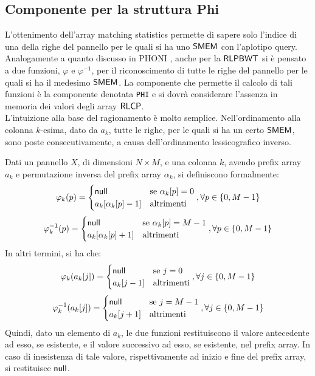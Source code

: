\subsection{Componente per la struttura Phi}
\label{secphi}
L'ottenimento dell'array matching statistics permette di sapere solo
l'indice di una della righe del pannello per le quali si ha uno $\mbox{\rm {\sf SMEM}}$ con
l'aplotipo query. Analogamente a quanto discusso in PHONI \cite{phoni},
anche per la $\mbox{\rm {\sf RLPBWT}}$ si è pensato a due funzioni, $\varphi$ e
$\varphi^{-1}$, per il riconoscimento di tutte le
righe del pannello per le quali si ha il medesimo $\mbox{\rm {\sf SMEM}}$. La componente che
permette il calcolo 
di tali funzioni è la componente denotata \texttt{PHI} e si dovrà considerare
l'assenza in memoria dei valori degli array $\mbox{\rm {\sf RLCP}}$.\\
L'intuizione alla base del ragionamento è molto semplice. Nell'ordinamento alla
colonna $k$-esima, dato da $a_k$, tutte le righe, per le quali si ha un certo
$\mbox{\rm {\sf SMEM}}$, sono poste consecutivamente, a causa dell'ordinamento
lessicografico inverso.
\begin{definizione}
  Dati un pannello $X$, di dimensioni $N\times M$, e una colonna $k$, avendo
  prefix array $a_k$ e permutazione inversa del prefix array $\alpha_k$, si
  definiscono formalmente: 
  \[\varphi_k(p)=
    \begin{cases}
      \mbox{\rm {\sf null}}&\mbox{se }\alpha_k[p]=0\\
      a_k[\alpha_k[p]-1]&\mbox{altrimenti}
    \end{cases},\forall p\in\{0,M-1\}
  \]
  \[\varphi^{-1}_k(p)=
    \begin{cases}
      \mbox{\rm {\sf null}}&\mbox{se }\alpha_k[p]=M-1\\
      a_k[\alpha_k[p]+1]&\mbox{altrimenti}
    \end{cases},\forall p\in\{0,M-1\}
  \]
  In altri termini, si ha che:
  \[\varphi_k(a_k[j])=
    \begin{cases}
     \mbox{\rm {\sf null}}&\mbox{se }j=0\\
      a_k[j-1]&\mbox{altrimenti}
    \end{cases},\forall j\in\{0,M-1\}
  \]
  \[\varphi^{-1}_k(a_k[j])=
    \begin{cases}
      \mbox{\rm {\sf null}}&\mbox{se }j=M-1\\
      a_k[j+1]&\mbox{altrimenti}
    \end{cases},\forall j\in\{0,M-1\}
  \]
  Quindi, dato un elemento di $a_k$, le due funzioni restituiscono il valore
  antecedente ad esso, se esistente, e il valore successivo ad esso, se
  esistente, nel prefix array. In caso di inesistenza di tale valore,
  rispettivamente ad inizio
  e fine del prefix array, si
  restituisce $\mbox{\rm {\sf null}}$.
\end{definizione}

